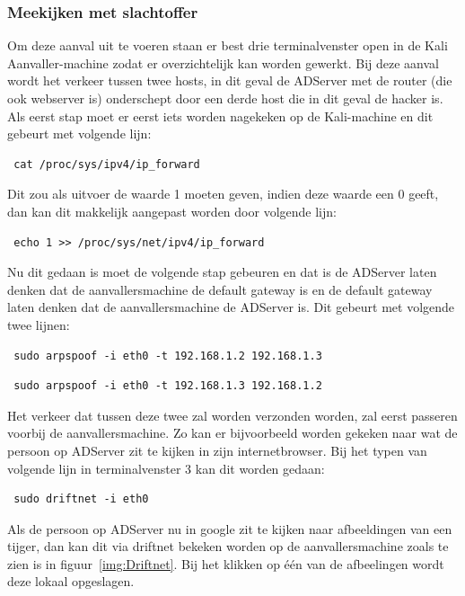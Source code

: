 \documentclass[pdftex,a4paper,12pt]{report}
\begin{document}
\subsubsection{Meekijken met slachtoffer}
Om deze aanval uit te voeren staan er best drie terminalvenster open in de Kali Aanvaller-machine zodat er overzichtelijk kan worden gewerkt. Bij deze aanval wordt het verkeer tussen twee hosts, in dit geval de ADServer met de router (die ook webserver is) onderschept door een derde host die in dit geval de hacker is. Als eerst stap moet er eerst iets worden nagekeken op de Kali-machine en dit gebeurt met volgende lijn:
\begin{verbatim} cat /proc/sys/ipv4/ip_forward \end{verbatim}
Dit zou als uitvoer de waarde 1 moeten geven, indien deze waarde een 0 geeft, dan kan dit makkelijk aangepast worden door volgende lijn:
\begin{verbatim} echo 1 >> /proc/sys/net/ipv4/ip_forward \end{verbatim}
Nu dit gedaan is moet de volgende stap gebeuren en dat is de ADServer laten denken dat de aanvallersmachine de default gateway is en de default gateway laten denken dat de aanvallersmachine de ADServer is. Dit gebeurt met volgende twee lijnen:
\begin{verbatim} sudo arpspoof -i eth0 -t 192.168.1.2 192.168.1.3 \end{verbatim}
\begin{verbatim} sudo arpspoof -i eth0 -t 192.168.1.3 192.168.1.2 \end{verbatim}
Het verkeer dat tussen deze twee zal worden verzonden worden, zal eerst passeren voorbij de aanvallersmachine. Zo kan er bijvoorbeeld worden gekeken naar wat de persoon op ADServer zit te kijken in zijn internetbrowser. Bij het typen van volgende lijn in terminalvenster 3 kan dit worden gedaan: 
\begin{verbatim} sudo driftnet -i eth0 \end{verbatim}
Als de persoon op ADServer nu in google zit te kijken naar afbeeldingen van een tijger, dan kan dit via driftnet bekeken worden op de aanvallersmachine zoals te zien is in figuur~\ref{img:Driftnet}. Bij het klikken op één van de afbeelingen wordt deze lokaal opgeslagen. \citep{Walsh2013}
\end{document}

